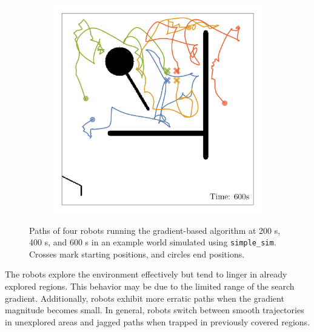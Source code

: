 \begin{figure}[H]
\begin{subfigure}[b]{\w}
    \end{subfigure}
    \begin{subfigure}[b]{\w}
        \centering
        \includegraphics[width=\textwidth]{./figures/plots/paths/search:gradient-paths-(after-600s).png}
    \end{subfigure}
    \caption{Paths of four robots running the gradient-based algorithm at 200 s, 400 s, and 600 s in an example
    world simulated using \texttt{simple\_sim}. Crosses mark starting positions, and circles end positions.}
    \label{fig:gradient-paths}
\end{figure}

The robots explore the environment effectively but tend to linger in already explored regions. This behavior may be due to the limited range of the search gradient. Additionally, robots exhibit more erratic paths when the gradient magnitude becomes small. In general, robots switch between smooth trajectories in unexplored areas and jagged paths when trapped in previously covered regions. \\


